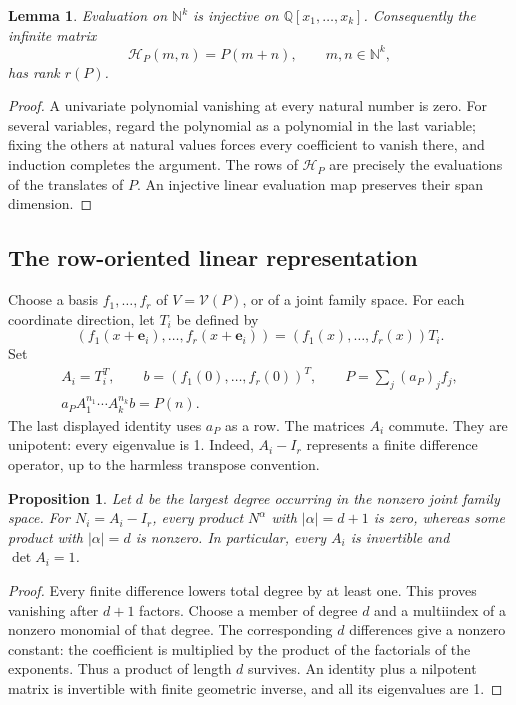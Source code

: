\documentclass[11pt,letterpaper]{article}
\newtheorem{lemma}[theorem]{Lemma}
\newtheorem{proposition}[theorem]{Proposition}
\theoremstyle{definition}
\theoremstyle{remark}
\newcommand{\N}{\mathbb N}
\newcommand{\Q}{\mathbb Q}
\newcommand{\e}{\mathbf e}
\newcommand{\calV}{\mathcal V}
\begin{document}
\begin{lemma}\label{ste:mx:lem:grid}
Evaluation on $\N^k$ is injective on $\Q[x_1,\ldots,x_k]$. Consequently the
infinite matrix
\begin{equation}\label{ste:mx:eq:hankel}
 \mathcal H_P(m,n)=P(m+n),\qquad m,n\in\N^k,
\end{equation}
has rank $r(P)$.
\end{lemma}
\begin{proof}
A univariate polynomial vanishing at every natural number is zero. For several
variables, regard the polynomial as a polynomial in the last variable; fixing
the others at natural values forces every coefficient to vanish there, and
induction completes the argument. The rows of $\mathcal H_P$ are precisely the
evaluations of the translates of $P$. An injective linear evaluation map
preserves their span dimension.
\end{proof}

\subsection{The row-oriented linear representation}

Choose a basis $f_1,\ldots,f_r$ of $V=\calV(P)$, or of a joint family space.
For each coordinate direction, let $T_i$ be defined by
\[
 (f_1(x+\e_i),\ldots,f_r(x+\e_i))
       =(f_1(x),\ldots,f_r(x))T_i.
\]
Set
\begin{equation}\label{ste:mx:eq:linrep}
 \begin{gathered}
 A_i=T_i^T,\qquad
 b=(f_1(0),\ldots,f_r(0))^T,\qquad
 P=\sum_j (a_P)_j f_j,\\
 a_P A_1^{n_1}\cdots A_k^{n_k}b=P(n).
 \end{gathered}
\end{equation}
The last displayed identity uses $a_P$ as a row. The matrices $A_i$ commute.
They are unipotent: every eigenvalue is 1. Indeed, $A_i-I_r$ represents a finite
difference operator, up to the harmless transpose convention.

\begin{proposition}\label{ste:mx:prop:depth}
Let $d$ be the largest degree occurring in the nonzero joint family space.
For $N_i=A_i-I_r$, every product $N^\alpha$ with $|\alpha|=d+1$ is zero,
whereas some product with $|\alpha|=d$ is nonzero. In particular, every $A_i$
is invertible and $\det A_i=1$.
\end{proposition}
\begin{proof}
Every finite difference lowers total degree by at least one. This proves
vanishing after $d+1$ factors. Choose a member of degree $d$ and a multiindex
of a nonzero monomial of that degree. The corresponding $d$ differences give
a nonzero constant: the coefficient is multiplied by the product of the
factorials of the exponents. Thus a product of length $d$ survives. An
identity plus a nilpotent matrix is invertible with finite geometric inverse,
and all its eigenvalues are 1.
\end{proof}
\end{document}
